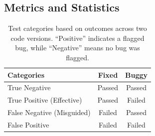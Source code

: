 \documentclass[acmsmall]{acmart}
\begin{document}
\subsection{Metrics and Statistics}
\begin{table}[!htbp]
    \vspace{-0.5em}
    \centering
    \scriptsize
    \caption{Test categories based on outcomes across two code versions. ``Positive'' indicates a flagged bug, while ``Negative'' means no bug was flagged.}
    \vspace{-0.4em}
    \label{tab:err_cats}
    \begin{tabular}{l|cc}
    \toprule
    \textbf{Categories} & \textbf{Fixed} & \textbf{Buggy}  \\
\midrule
     True Negative    & Passed & Passed \\
     True Positive (Effective)   & Passed & Failed \\
     False Negative (Misguided)   & Failed & Passed \\
     False Positive   & Failed & Failed \\
     \bottomrule
    \end{tabular}
\vspace{-0.6em}
\end{table}
\label{subsec:metrics}
\end{document}
